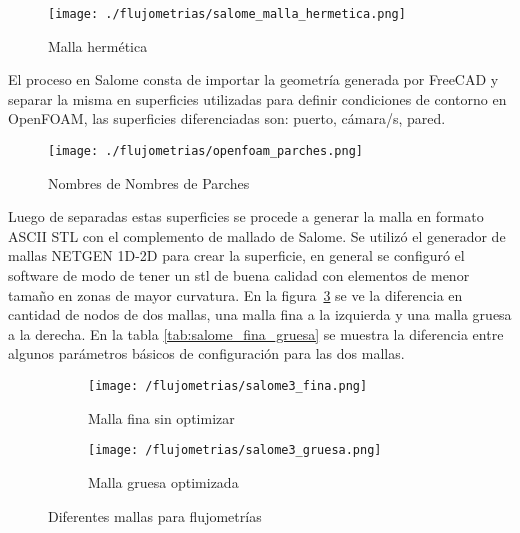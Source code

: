 \begin{figure}
    \centering
    \texttt{[image: ./flujometrias/salome\_malla\_hermetica.png]}
    \caption{Malla hermética}\label{fig:salome_malla_hermetica}
\end{figure}

El proceso en Salome consta de importar la geometría generada por FreeCAD y
separar la misma en superficies utilizadas para definir condiciones de contorno
en OpenFOAM, las superficies diferenciadas son: puerto, cámara/s, pared.

\begin{figure}
    \centering
    \texttt{[image: ./flujometrias/openfoam\_parches.png]}
    \caption{Nombres de Nombres de Parches}\label{fig:openfoam_parches}
\end{figure}

Luego de separadas estas superficies se procede a generar la malla en formato
ASCII STL con el complemento de mallado de Salome.
%
Se utilizó el generador de mallas NETGEN 1D-2D para crear la superficie, en
general se configuró el software de modo de tener un stl de buena calidad con
elementos de menor tamaño en zonas de mayor curvatura.
%
En la figura~\ref{fig:salome_fina_gruesa} se ve la diferencia en cantidad de
nodos de dos mallas, una malla fina a la izquierda y una malla gruesa a la
derecha.
%
En la tabla \ref{tab:salome_fina_gruesa} se muestra la diferencia entre algunos
parámetros básicos de configuración para las dos mallas.
%

\begin{figure}[t!]
    \centering
    \begin{subfigure}[t]{0.5\textwidth}
        \centering
        \texttt{[image: /flujometrias/salome3\_fina.png]}
        \caption{Malla fina sin optimizar}
    \end{subfigure}%
    \begin{subfigure}[t]{0.5\textwidth}
        \centering
        \texttt{[image: /flujometrias/salome3\_gruesa.png]}
        \caption{Malla gruesa optimizada}
    \end{subfigure}
    \caption{Diferentes mallas para flujometrías}\label{fig:salome_fina_gruesa}
\end{figure}

